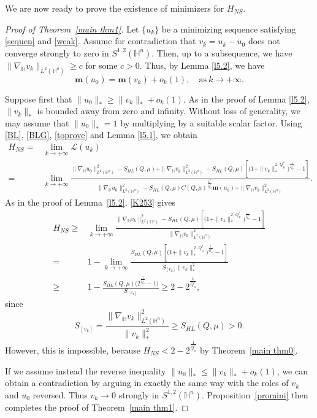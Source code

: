 \documentclass[10pt,a4paper]{amsart}
\begin{document}
We are now ready to prove the existence of minimizers for $H_{NS}$.
\begin{proof}
[Proof of Theorem~\ref{main thm1}]
{Let $\{u_k\}$ be a minimizing sequence satisfying \eqref{sequen} and \eqref{weak}. Assume for contradiction that} $v_k=u_k-u_0$ does not converge strongly to zero in $S^{1,2}(\mathbb{H}^{n})$. Then, up to a subsequence, we have $\|\nabla_\mathbb{H} v_k\|_{L^2(\mathbb{H}^n)}\geq c$ for some $c>0$. Thus, by Lemma \ref{l5.2}, we have
\begin{equation}\label{toprove}
 \mathbf{m}(u_0) =\mathbf{m}(v_k)+o_k(1),\quad \mathrm{as} ~k\rightarrow+\infty.
\end{equation}

Suppose first that $\|u_0\|_*\geq\|v_k\|_*+o_k(1)$. As in the proof of Lemma \ref{l5.2}, $\|v_k\|_*$ is bounded away from zero and infinity.
Without loss of generality,
we may assume that $\|u_0\|_*=1$ by multiplying by a suitable scalar factor. Using
\eqref{BL}, \eqref{BLG}, \eqref{toprove} and Lemma \ref{l5.1}, we obtain
\begin{align*}
 H_{NS}=&\lim\limits_{k\rightarrow+\infty}\mathcal{L}(u_k)\\
 =&
\lim\limits_{k\rightarrow+\infty}\frac{\|\nabla_\mathbb{H} u_0\|_{L^2(\mathbb{H}^n)}^2-S_{HL}(Q,\mu)+\|\nabla_\mathbb{H} v_k\|_{L^2(\mathbb{H}^n)}^2-S_{HL}(Q,\mu) \left[\Big(1+\|v_k\|_*^{2\cdot Q^{\ast}_{\mu}}\Big)^{\frac{1}{Q^{\ast}_{\mu}}}-1\right]}
{\|\nabla_\mathbb{H} u_0\|_{L^2(\mathbb{H}^n)}^2-S_{HL}(Q,\mu)C(Q,\mu)^{\frac{Q^{\ast}}{Q^{\ast}_{\mu}}}\mathbf{m}(u_0)+
\|\nabla_\mathbb{H} v_k\|_{L^2(\mathbb{H}^n)}^2}.
\end{align*}
{As in the proof of Lemma~\ref{l5.2}, \eqref{K253} gives}
\begin{align*}
 H_{NS}\geq& \lim\limits_{k\rightarrow+\infty}\frac{\|\nabla_\mathbb{H} v_k\|_{L^2(\mathbb{H}^n)}^2-S_{HL}(Q,\mu) \left[\Big(1+\|v_k\|_*^{2\cdot Q^{\ast}_{\mu}}\Big)^{\frac{1}{Q^{\ast}_{\mu}}}-1\right]}
{
\|\nabla_\mathbb{H} v_k\|_{L^2(\mathbb{H}^n)}^2}\\
=&1-\lim\limits_{k\rightarrow+\infty}\frac{S_{HL}(Q,\mu) \left[\Big(1+\|v_k\|_*^{2\cdot Q^{\ast}_{\mu}}\Big)^{\frac{1}{Q^{\ast}_{\mu}}}-1\right]}
{
S_{[v_{k}]}\|v_{k}\|_*^2}\\
\geq& 1-\frac{S_{HL}(Q,\mu) \Big(2^{\frac{1}{Q^{\ast}_{\mu}}}-1\Big)}
{
S_{[v_{k}]}}\geq 2-2^{\frac{1}{Q^{\ast}_{\mu}}},
\end{align*}
since
 \begin{equation*}
 S_{[v_{k}]}=\frac{\|\nabla_\mathbb{H} v_{k}\|_{L^2(\mathbb{H}^n)}^2}{\|v_{k}\|_*^2}\geq S_{HL}(Q,\mu)>0.
 \end{equation*}
However, this is impossible, because $H_{NS}<2-2^{\frac{1}{Q^{\ast}_{\mu}}}$ by Theorem~\ref{main thm0}.

If we assume instead the reverse inequality $\|u_0\|_*\leq\|v_k\|_*+o_k(1)$, we can obtain a contradiction by arguing in exactly the same way with the roles of $v_k$ and $u_0$ reversed.
{Thus $v_k\to0$ strongly in $S^{1,2}(\mathbb H^n)$. Proposition~\ref{promini} then completes the proof of Theorem~\ref{main thm1}.}
\end{proof}
\end{document}
